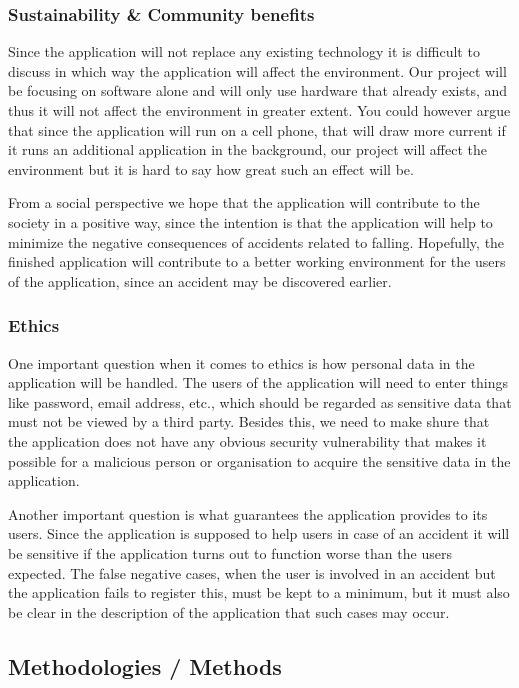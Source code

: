 \documentclass[11pt, a4paper, onecolumn]{article}
\begin{document}
	\subsubsection{Sustainability \& Community benefits}
	
	Since the application will not replace any existing technology it is difficult to discuss in which way the application will affect the environment. Our project will be focusing on software alone and will only use hardware that already exists, and thus it will not affect the environment in greater extent. You could however argue that since the application will run on a cell phone, that will draw more current if it runs an additional application in the background, our project will affect the environment but it is hard to say how great such an effect will be.
	
	From a social perspective we hope that the application will contribute to the society in a positive way, since the intention is that the application will help to minimize the negative consequences of accidents related to falling. Hopefully, the finished application will contribute to a better working environment for the users of the application, since an accident may be discovered earlier.  
	
	\subsubsection{Ethics}
	
	One important question when it comes to ethics is how personal data in the application will be handled. The users of the application will need to enter things like password, email address, etc., which should be regarded as sensitive data that must not be viewed by a third party. Besides this, we need to make shure that the application does not have any obvious security vulnerability that makes it possible for a malicious person or organisation to acquire the sensitive data in the application.
	
	Another important question is what guarantees the application provides to its users. Since the application is supposed to help users in case of an accident it will be sensitive if the application turns out to function worse than the users expected. The false negative cases, when the user is involved in an accident but the application fails to register this, must be kept to a minimum, but it must also be clear in the description of the application that such cases may occur.
	
	\subsection{Methodologies / Methods}
	
\end{document}

